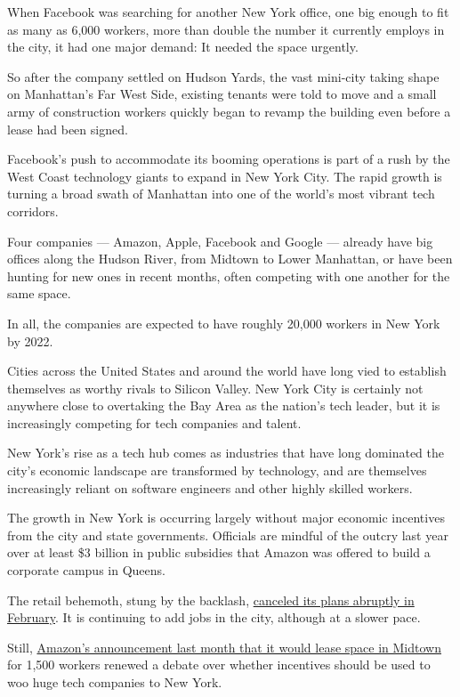 When Facebook was searching for another New York office, one big enough
to fit as many as 6,000 workers, more than double the number it
currently employs in the city, it had one major demand: It needed the
space urgently.

So after the company settled on Hudson Yards, the vast mini-city taking
shape on Manhattan's Far West Side, existing tenants were told to move
and a small army of construction workers quickly began to revamp the
building even before a lease had been signed.

Facebook's push to accommodate its booming operations is part of a rush
by the West Coast technology giants to expand in New York City. The
rapid growth is turning a broad swath of Manhattan into one of the
world's most vibrant tech corridors.

Four companies --- Amazon, Apple, Facebook and Google --- already have
big offices along the Hudson River, from Midtown to Lower Manhattan, or
have been hunting for new ones in recent months, often competing with
one another for the same space.

In all, the companies are expected to have roughly 20,000 workers in New
York by 2022.

Cities across the United States and around the world have long vied to
establish themselves as worthy rivals to Silicon Valley. New York City
is certainly not anywhere close to overtaking the Bay Area as the
nation's tech leader, but it is increasingly competing for tech
companies and talent.

New York's rise as a tech hub comes as industries that have long
dominated the city's economic landscape are transformed by technology,
and are themselves increasingly reliant on software engineers and other
highly skilled workers.

The growth in New York is occurring largely without major economic
incentives from the city and state governments. Officials are mindful of
the outcry last year over at least \$3 billion in public subsidies that
Amazon was offered to build a corporate campus in Queens.

The retail behemoth, stung by the backlash,
\href{https://www.nytimes.com/2019/02/14/nyregion/amazon-hq2-queens.html}{canceled
its plans abruptly in February}. It is continuing to add jobs in the
city, although at a slower pace.

Still,
\href{https://www.nytimes.com/2019/12/06/nyregion/amazon-hudson-yards.html}{Amazon's
announcement last month that it would lease space in Midtown} for 1,500
workers renewed a debate over whether incentives should be used to woo
huge tech companies to New York.

